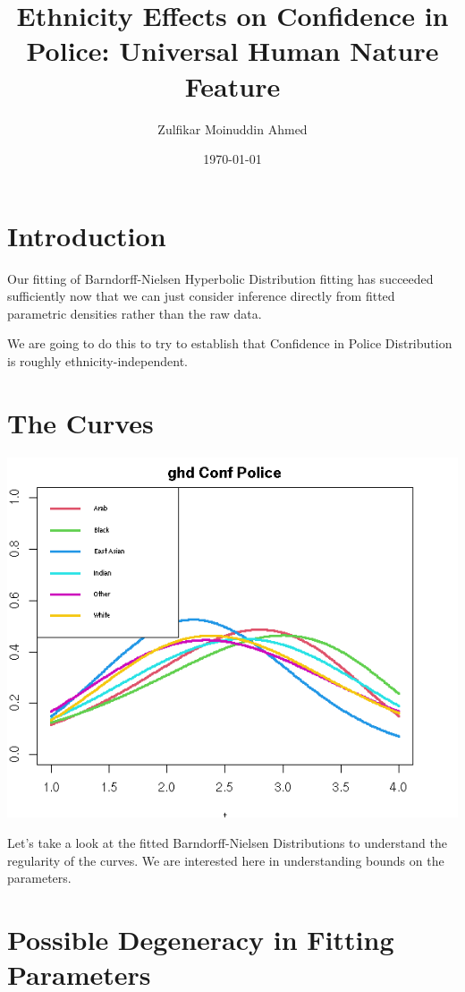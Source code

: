 \documentclass{amsart}
\title{Ethnicity Effects on Confidence in Police: Universal Human Nature Feature}
\author{Zulfikar Moinuddin Ahmed}
\date{\today}
\begin{document}
\maketitle

\section{Introduction}

Our fitting of Barndorff-Nielsen Hyperbolic Distribution fitting has succeeded sufficiently now that we can just consider inference directly from fitted parametric densities rather than the raw data.  

We are going to do this to try to establish that Confidence in Police Distribution is roughly ethnicity-independent.

\section{The Curves}

\includegraphics[scale=0.8]{cfpolice_fitted.png}

Let's take a look at the fitted Barndorff-Nielsen Distributions to understand the regularity of the curves.  We are interested here in understanding bounds on the parameters.

\pagebreak

\section{Possible Degeneracy in Fitting Parameters}
\end{document}
